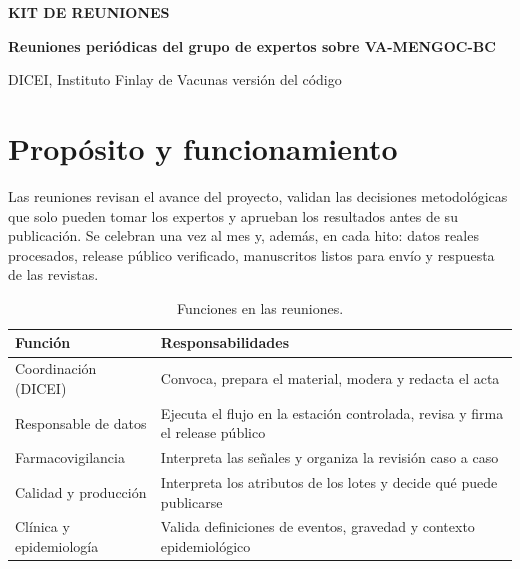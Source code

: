 \documentclass[11pt]{article}
\begin{document}
\begin{center}
{\small\textcolor{vblue}{\textbf{KIT DE REUNIONES}}\par}
\medskip
{\Large\bfseries Reuniones periódicas del grupo de expertos sobre VA-MENGOC-BC\par}
\medskip
{\small DICEI, Instituto Finlay de Vacunas \textperiodcentered{} versión del código
\VCodeVersion\par}
\end{center}

\section{Propósito y funcionamiento}
Las reuniones revisan el avance del proyecto, validan las decisiones metodológicas que solo pueden
tomar los expertos y aprueban los resultados antes de su publicación. Se celebran una vez al mes y,
además, en cada hito: datos reales procesados, release público verificado, manuscritos listos para
envío y respuesta de las revistas.

\begin{table}[htbp]
\centering\small
\caption{Funciones en las reuniones.}
\begin{tabularx}{\linewidth}{@{}>{\raggedright\arraybackslash}p{4.2cm}Y@{}}
\toprule
Función & Responsabilidades\\
\midrule
Coordinación (DICEI) & Convoca, prepara el material, modera y redacta el acta\\
Responsable de datos & Ejecuta el flujo en la estación controlada, revisa y firma el release
  público\\
Farmacovigilancia & Interpreta las señales y organiza la revisión caso a caso\\
Calidad y producción & Interpreta los atributos de los lotes y decide qué puede publicarse\\
Clínica y epidemiología & Valida definiciones de eventos, gravedad y contexto epidemiológico\\
\bottomrule
\end{tabularx}
\end{table}
\end{document}
